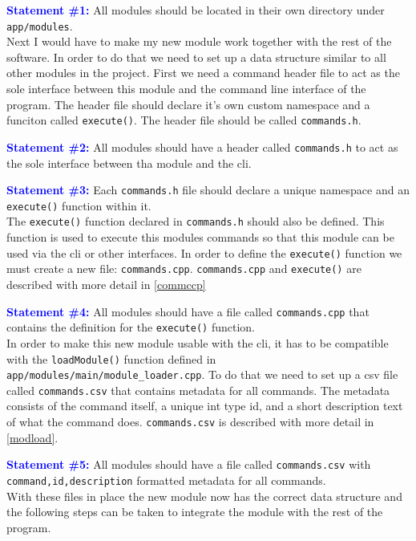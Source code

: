 \documentclass{article}
\newcommand{\statement}[1]{\par\medskip
  \textcolor{blue}{\textbf{#1:}}\space
}
\begin{document}
\statement{Statement \#1} All modules should be located in their own directory 
under \texttt{app/modules}. \\

Next I would have to make my new module work together with the rest of the 
software. In order to do that we need to set up a data structure similar to 
all other modules in the project. First we need a command header file to act 
as the sole interface between this module and the command line interface of 
the program. The header file should declare it's own custom namespace and a 
funciton called \texttt{execute()}. The header file should be called 
\texttt{commands.h}.

\statement{Statement \#2} All modules should have a header called 
\texttt{commands.h} to act as the sole interface between tha module and the 
cli. 

\statement{Statement \#3} Each \texttt{commands.h} file should declare a 
unique namespace and an \texttt{execute()} function within it. \\

The \texttt{execute()} function declared in \texttt{commands.h} should also be 
defined. This function is used to execute this modules commands so that this 
module can be used via the cli or other interfaces. In order to define the 
\texttt{execute()} function we must create a new file: \texttt{commands.cpp}. 
\texttt{commands.cpp} and \texttt{execute()} are described with more detail in 
\ref{commccp}

\statement{Statement \#4} All modules should have a file called 
\texttt{commands.cpp} that contains the definition for the \texttt{execute()} 
function. \\

In order to make this new module usable with the cli, it has to be compatible 
with the \texttt{loadModule()} function defined in 
\texttt{app/modules/main/module\_loader.cpp}. To do that we need to set up a 
csv file called \texttt{commands.csv} that contains metadata for all commands. 
The metadata consists of the command itself, a unique int type id, and a 
short description text of what the command does. \texttt{commands.csv} is 
described with more detail in \ref{modload}.

\statement{Statement \#5} All modules should have a file called 
\texttt{commands.csv} with \texttt{command,id,description} formatted metadata 
for all commands. \\

With these files in place the new module now has the correct data structure 
and the following steps can be taken to integrate the module with the rest of 
the program.
\end{document}
